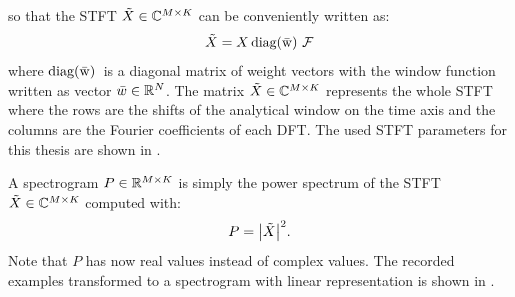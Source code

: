 so that the STFT $\tilde{X} \in \mathbb{C}^{M \times K}$ can be conveniently written as:
\begin{equation}\label{eq:signal_spec_stft_matrix}
  \tilde{X} = X \, \mathrm{diag(\bar{w})\,} \, \mathcal{F}
\end{equation}
where $\mathrm{diag(\bar{w})\,}$ is a diagonal matrix of weight vectors with the window function written as vector $\bar{w} \in \mathbb{R}^N$.
The matrix $\tilde{X} \in \mathbb{C}^{M \times K}$ represents the whole STFT where the rows are the shifts of the analytical window on the time axis and the columns are the Fourier coefficients of each DFT.
The used STFT parameters for this thesis are shown in .

A spectrogram $P \in \mathbb{R}^{M \times K}$ is simply the power spectrum of the STFT $\tilde{X} \in \mathbb{C}^{M \times K}$ computed with:
\begin{equation}\label{eq:signal_spec_spec}
  P = \abs{\tilde{X}}^2.
\end{equation}
Note that $P$ has now real values instead of complex values.
The recorded examples transformed to a spectrogram with linear representation is shown in .

